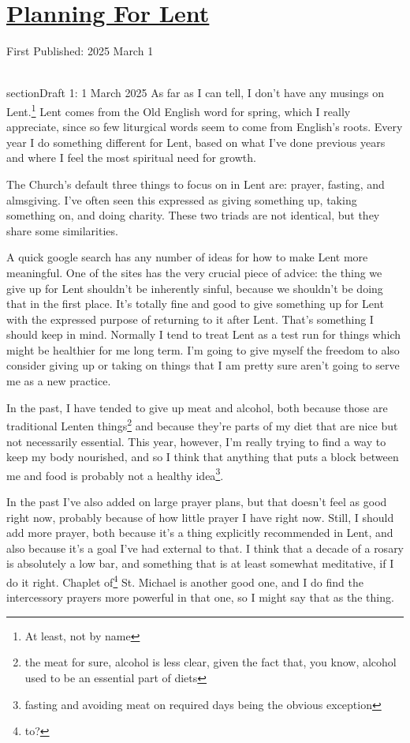 \documentclass[12pt]{article}[titlepage]
\renewcommand{\,}{\textsuperscript{,}}
\begin{document}
\doublespacing
\section{\href{planning-lent-2025.html}{Planning For Lent}}
First Published: 2025 March 1

\\section{Draft 1: 1 March 2025}  
As far as I can tell, I don't have any musings on Lent.\footnote{At least, not by name}  
Lent comes from the Old English word for spring, which I really appreciate, since so few liturgical words seem to come from English's roots.  
Every year I do something different for Lent, based on what I've done previous years and where I feel the most spiritual need for growth.  


The Church's default three things to focus on in Lent are: prayer, fasting, and almsgiving.  
I've often seen this expressed as giving something up, taking something on, and doing charity.  
These two triads are not identical, but they share some similarities.

A quick google search has any number of ideas for how to make Lent more meaningful.  
One of the sites has the very crucial piece of advice: the thing we give up for Lent shouldn't be inherently sinful, because we shouldn't be doing that in the first place.  
It's totally fine and good to give something up for Lent with the expressed purpose of returning to it after Lent.  
That's something I should keep in mind.  
Normally I tend to treat Lent as a test run for things which might be healthier for me long term.  
I'm going to give myself the freedom to also consider giving up or taking on things that I am pretty sure aren't going to serve me as a new practice.

In the past, I have tended to give up meat and alcohol, both because those are traditional Lenten things\footnote{the meat for sure, alcohol is less clear, given the fact that, you know, alcohol used to be an essential part of diets} and because they're parts of my diet that are nice but not necessarily essential.  
This year, however, I'm really trying to find a way to keep my body nourished, and so I think that anything that puts a block between me and food is probably not a healthy idea\footnote{fasting and avoiding meat on required days being the obvious exception}.

In the past I've also added on large prayer plans, but that doesn't feel as good right now, probably because of how little prayer I have right now.  
Still, I should add more prayer, both because it's a thing explicitly recommended in Lent, and also because it's a goal I've had external to that.  
I think that a decade of a rosary is absolutely a low bar, and something that is at least somewhat meditative, if I do it right.  
Chaplet of\footnote{to?} St. Michael is another good one, and I do find the intercessory prayers more powerful in that one, so I might say that as the thing.
\end{document}
